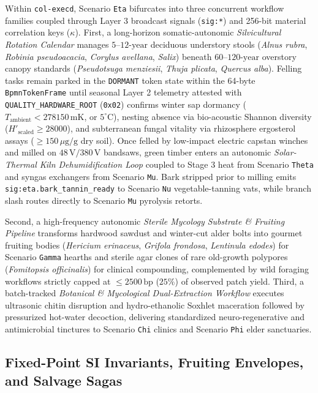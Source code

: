 Within \texttt{col-execd}, Scenario \texttt{Eta} bifurcates into three concurrent workflow families coupled through Layer 3 broadcast signals
(\texttt{sig:*}) and 256-bit material correlation keys ($\kappa$). First, a long-horizon somatic-autonomic \emph{Silvicultural Rotation Calendar}
manages $5\text{--}12\text{-year}$ deciduous understory stools (\emph{Alnus rubra}, \emph{Robinia pseudoacacia}, \emph{Corylus avellana},
\emph{Salix}) beneath $60\text{--}120\text{-year}$ overstory canopy standards (\emph{Pseudotsuga menziesii}, \emph{Thuja plicata}, \emph{Quercus
alba}). Felling tasks remain parked in the \texttt{DORMANT} token state within the 64-byte \texttt{BpmnTokenFrame} until seasonal Layer 2
telemetry attested with \texttt{QUALITY\_HARDWARE\_ROOT} (\texttt{0x02}) confirms winter sap dormancy
($T_{\mathrm{ambient}} < 278150\,\mathrm{mK}$, or $5^\circ\mathrm{C}$), nesting absence via bio-acoustic Shannon diversity
($H'_{\mathrm{scaled}} \ge 28000$), and subterranean fungal vitality via rhizosphere ergosterol assays ($\ge 150\,\mu\mathrm{g/g}$ dry soil).
Once felled by low-impact electric capstan winches and milled on $48\,\mathrm{V}/380\,\mathrm{V}$ bandsaws, green timber enters an autonomic
\emph{Solar-Thermal Kiln Dehumidification Loop} coupled to Stage 3 heat from Scenario \texttt{Theta} and syngas exchangers from Scenario
\texttt{Mu}. Bark stripped prior to milling emits \texttt{sig:eta.bark\_tannin\_ready} to Scenario \texttt{Nu} vegetable-tanning vats, while
branch slash routes directly to Scenario \texttt{Mu} pyrolysis retorts.

Second, a high-frequency autonomic \emph{Sterile Mycology Substrate \& Fruiting Pipeline} transforms hardwood sawdust and winter-cut alder bolts
into gourmet fruiting bodies (\emph{Hericium erinaceus}, \emph{Grifola frondosa}, \emph{Lentinula edodes}) for Scenario \texttt{Gamma} hearths
and sterile agar clones of rare old-growth polypores (\emph{Fomitopsis officinalis}) for clinical compounding, complemented by wild foraging
workflows strictly capped at $\le 2500\,\mathrm{bp}$ ($25\%$) of observed patch yield. Third, a batch-tracked \emph{Botanical \& Mycological
Dual-Extraction Workflow} executes ultrasonic chitin disruption and hydro-ethanolic Soxhlet maceration followed by pressurized hot-water
decoction, delivering standardized neuro-regenerative and antimicrobial tinctures to Scenario \texttt{Chi} clinics and Scenario \texttt{Phi}
elder sanctuaries.

\subsection{Fixed-Point SI Invariants, Fruiting Envelopes, and Salvage Sagas}

